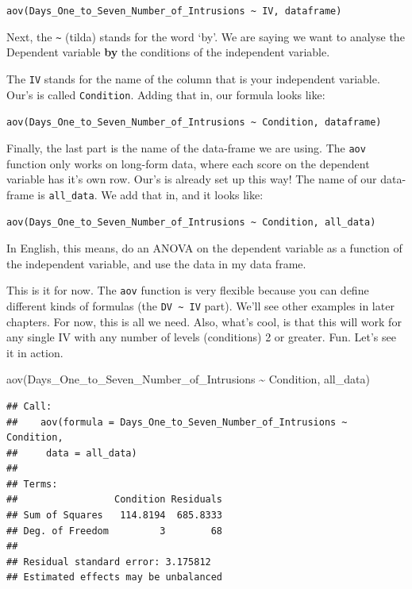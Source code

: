 \documentclass[
]{book}
\newenvironment{Shaded}{\begin{snugshade}}{\end{snugshade}}
\newcommand{\FunctionTok}[1]{\textcolor[rgb]{0.00,0.00,0.00}{#1}}
\newcommand{\NormalTok}[1]{#1}
\newcommand{\SpecialCharTok}[1]{\textcolor[rgb]{0.00,0.00,0.00}{#1}}
\begin{document}
\texttt{aov(Days\_One\_to\_Seven\_Number\_of\_Intrusions\ \textasciitilde{}\ IV,\ dataframe)}

Next, the \texttt{\textasciitilde{}} (tilda) stands for the word `by'. We are saying we want to analyse the Dependent variable \textbf{by} the conditions of the independent variable.

The \texttt{IV} stands for the name of the column that is your independent variable. Our's is called \texttt{Condition}. Adding that in, our formula looks like:

\texttt{aov(Days\_One\_to\_Seven\_Number\_of\_Intrusions\ \textasciitilde{}\ Condition,\ dataframe)}

Finally, the last part is the name of the data-frame we are using. The \texttt{aov} function only works on long-form data, where each score on the dependent variable has it's own row. Our's is already set up this way! The name of our data-frame is \texttt{all\_data}. We add that in, and it looks like:

\texttt{aov(Days\_One\_to\_Seven\_Number\_of\_Intrusions\ \textasciitilde{}\ Condition,\ all\_data)}

In English, this means, do an ANOVA on the dependent variable as a function of the independent variable, and use the data in my data frame.

This is it for now. The \texttt{aov} function is very flexible because you can define different kinds of formulas (the \texttt{DV\ \textasciitilde{}\ IV} part). We'll see other examples in later chapters. For now, this is all we need. Also, what's cool, is that this will work for any single IV with any number of levels (conditions) 2 or greater. Fun. Let's see it in action.

\begin{Shaded}
\begin{Highlighting}[]
\FunctionTok{aov}\NormalTok{(Days\_One\_to\_Seven\_Number\_of\_Intrusions }\SpecialCharTok{\textasciitilde{}}\NormalTok{ Condition, all\_data)}
\end{Highlighting}
\end{Shaded}

\begin{verbatim}
## Call:
##    aov(formula = Days_One_to_Seven_Number_of_Intrusions ~ Condition, 
##     data = all_data)
## 
## Terms:
##                 Condition Residuals
## Sum of Squares   114.8194  685.8333
## Deg. of Freedom         3        68
## 
## Residual standard error: 3.175812
## Estimated effects may be unbalanced
\end{verbatim}
\end{document}

